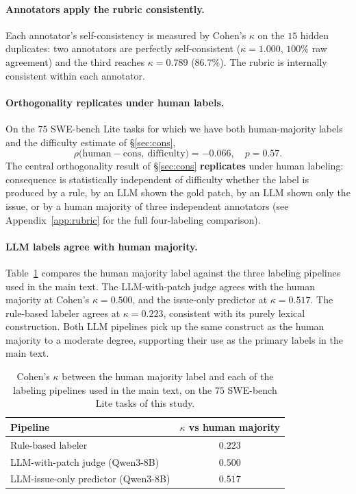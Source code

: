 \documentclass{article}
\begin{document}
\paragraph{Annotators apply the rubric consistently.} Each annotator's
self-consistency is measured by Cohen's $\kappa$ on the $15$ hidden
duplicates: two annotators are perfectly self-consistent
($\kappa = 1.000$, $100\%$ raw agreement) and the third reaches
$\kappa = 0.789$ ($86.7\%$). The rubric is internally consistent
within each annotator.

\paragraph{Orthogonality replicates under human labels.} On the $75$
SWE-bench Lite tasks for which we have both human-majority labels and
the difficulty estimate of \S\ref{sec:cons},
\[
\rho\bigl(\mathrm{human}\!-\!\mathrm{cons},\ \mathrm{difficulty}\bigr) = -0.066,\quad p = 0.57.
\]
The central orthogonality result of \S\ref{sec:cons} \textbf{replicates}
under human labeling: consequence is statistically independent of
difficulty whether the label is produced by a rule, by an LLM shown
the gold patch, by an LLM shown only the issue, or by a human
majority of three independent annotators
(see Appendix~\ref{app:rubric} for the full four-labeling comparison).

\paragraph{LLM labels agree with human majority.}
Table~\ref{tab:human-vs-llm} compares the human majority label against
the three labeling pipelines used in the main text. The LLM-with-patch
judge agrees with the human majority at Cohen's $\kappa = 0.500$, and
the issue-only predictor at $\kappa = 0.517$. The rule-based labeler
agrees at $\kappa = 0.223$, consistent with its purely lexical
construction. Both LLM pipelines pick up the same construct as the
human majority to a moderate degree, supporting their use as the
primary labels in the main text.

\begin{table}[h]
\centering
\caption{Cohen's $\kappa$ between the human majority label and each of
the labeling pipelines used in the main text, on the $75$ SWE-bench
Lite tasks of this study.}
\label{tab:human-vs-llm}
\small
\begin{tabular}{lc}
\toprule
Pipeline & $\kappa$ vs human majority \\
\midrule
Rule-based labeler                       & $0.223$ \\
LLM-with-patch judge (Qwen3-8B)          & $0.500$ \\
LLM-issue-only predictor (Qwen3-8B)      & $0.517$ \\
\bottomrule
\end{tabular}
\end{table}
\end{document}
